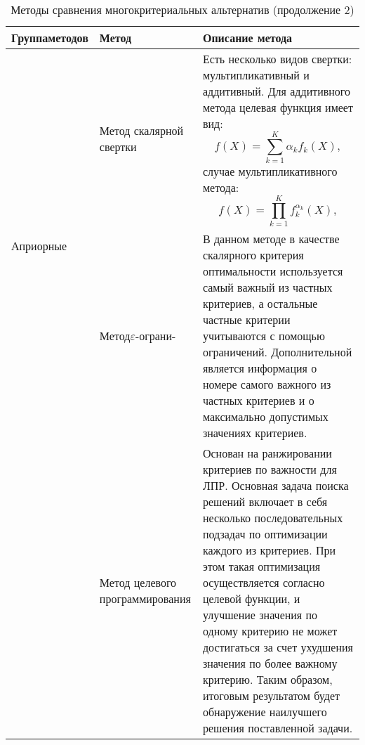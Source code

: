 \begin{table}[H]
	\centering
	\caption{Методы сравнения многокритериальных альтернатив (продолжение 2)}
	\label{mko_table_2}
	\begin{tabular}{|p{3.3cm}|p{2.4cm}|p{9.5cm}|}
		\hline
		\textbf{Группа\linebreak методов} & \textbf{Метод} & \textbf{Описание метода} \\
		\hline
		\multirow{2}{3.3cm}{Априорные} & Метод скалярной свертки & Есть несколько видов свертки: мультипликативный и аддитивный. Для аддитивного метода целевая функция имеет вид:
		\begin{equation}
		f(X) = \sum\limits_{k=1}^{K} \alpha_{k} f_{k}(X),
		\end{equation} случае мультипликативного метода:
		\begin{equation}
		f(X) = \prod_{k=1}^{K} f_{k}^{\alpha_{k}}(X),
		\end{equation}\\
		\cline{2-3} & Метод\linebreak$\varepsilon$-ограни- & В данном методе в качестве скалярного критерия оптимальности используется самый важный из частных критериев, а остальные частные критерии учитываются с помощью ограничений. Дополнительной является информация о номере самого важного из частных критериев и о максимально допустимых значениях критериев.\\
		\cline{2-3} & Метод целевого программирования & Основан на ранжировании критериев по важности для ЛПР. Основная задача поиска решений включает в себя несколько последовательных подзадач по оптимизации каждого из критериев. При этом такая оптимизация осуществляется согласно целевой функции, и улучшение значения по одному критерию не может достигаться за счет ухудшения значения по более важному критерию. Таким образом, итоговым результатом будет обнаружение наилучшего решения поставленной задачи. \\
		\hline
	\end{tabular}
\end{table}

